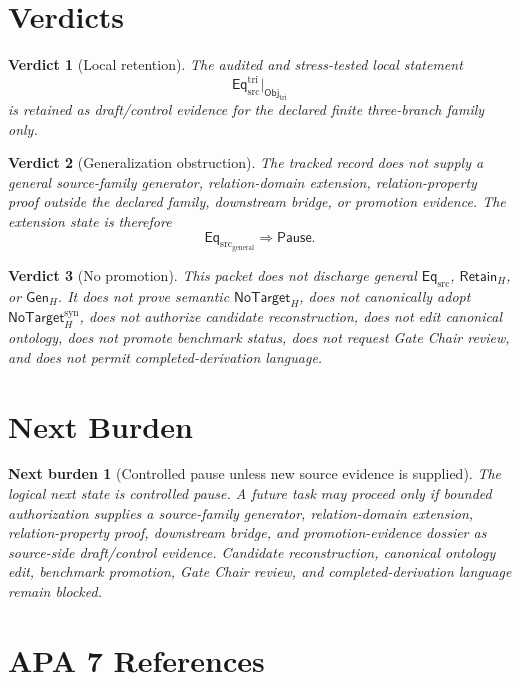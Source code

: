 \documentclass[11pt]{article}
\newcommand{\EqSrc}{\mathsf{Eq}_{\mathrm{src}}}
\newcommand{\EqTri}{\mathsf{Eq}_{\mathrm{src}}^{\mathrm{tri}}}
\newcommand{\ObjTri}{\mathsf{Obj}_{\mathrm{tri}}}
\newcommand{\RetainH}{\mathsf{Retain}_{H}}
\newcommand{\GenH}{\mathsf{Gen}_{H}}
\newcommand{\NoTargetH}{\mathsf{NoTarget}_{H}}
\newcommand{\NoTargetSyn}{\mathsf{NoTarget}_{H}^{\mathrm{syn}}}
\newcommand{\Pause}{\mathsf{Pause}}
\newtheorem{verdict}{Verdict}
\newtheorem{nextburden}{Next burden}
\begin{document}
\section{Verdicts}

\begin{verdict}[Local retention]
The audited and stress-tested local statement
\[
    \EqTri\big|_{\ObjTri}
\]
is retained as draft/control evidence for the declared finite
three-branch family only.
\end{verdict}

\begin{verdict}[Generalization obstruction]
The tracked record does not supply a general source-family generator,
relation-domain extension, relation-property proof outside the declared
family, downstream bridge, or promotion evidence. The extension state is
therefore
\[
    \EqSrc_{\mathrm{general}}\Rightarrow \Pause.
\]
\end{verdict}

\begin{verdict}[No promotion]
This packet does not discharge general \(\EqSrc\), \(\RetainH\), or
\(\GenH\). It does not prove semantic \(\NoTargetH\), does not
canonically adopt \(\NoTargetSyn\), does not authorize candidate
reconstruction, does not edit canonical ontology, does not promote
benchmark status, does not request Gate Chair review, and does not
permit completed-derivation language.
\end{verdict}

\section{Next Burden}

\begin{nextburden}[Controlled pause unless new source evidence is supplied]
The logical next state is controlled pause. A future task may proceed
only if bounded authorization supplies a source-family generator,
relation-domain extension, relation-property proof, downstream bridge,
and promotion-evidence dossier as source-side draft/control evidence.
Candidate reconstruction, canonical ontology edit, benchmark promotion,
Gate Chair review, and completed-derivation language remain blocked.
\end{nextburden}

\section*{APA 7 References}
\end{document}
